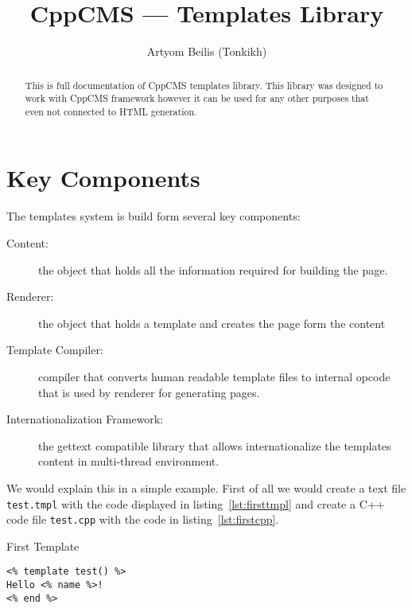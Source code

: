 \documentclass{article}
\title{CppCMS --- Templates Library}
\author{Artyom Beilis (Tonkikh)}
\newcommand{\tw}[1]{\texttt{#1}}
\begin{document}
\maketitle
\tableofcontents


\begin{htmlonly}
	\newenvironment{\program}{
		\begin{rawhtml}
		<div style="float:right; clear:right; width:500px; padding-left:20px">
		\end{rawhtml}
		}{
		\begin{rawhtml}
		</div>
		\end{rawhtml}
		}
	\renewcommand{\caption}[1]{\textbf{#1}}
\end{htmlonly}

\begin{abstract}
This is full documentation of CppCMS templates library. This library was designed to work with CppCMS framework however
it can be used for any other purposes that even not connected to HTML generation.
\end{abstract}
\section{Key Components}
The templates system is build form several key components:
\begin{description}
\item[Content:] the object that holds all the information required for building the page.
\item[Renderer:] the object that holds a template and creates the page form the content
\item[Template Compiler:] compiler that converts human readable template files to internal opcode that is used by renderer for generating pages.
\item[Internationalization Framework:] the gettext compatible library that allows internationalize the templates content in multi-thread environment.
\end{description}

We would explain this in a simple example.
First of all we would create a text file \tw{test.tmpl} with the
code displayed in listing~\ref{lst:firsttmpl} and create a C++ code file \tw{test.cpp}
with the code in listing~\ref{lst:firstcpp}.

\begin{program}
\caption{First Template\label{lst:firsttmpl}}
\begin{verbatim}
<% template test() %>
Hello <% name %>!
<% end %>
\end{verbatim}
\end{program}
\end{document}
